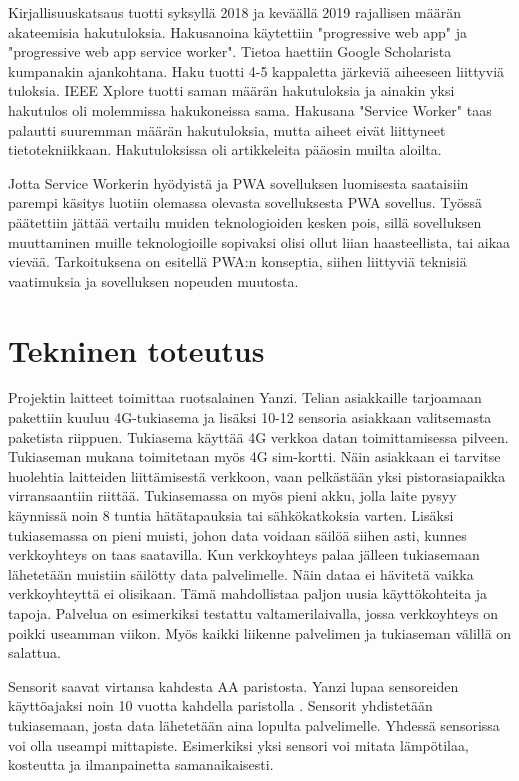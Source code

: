 \documentclass{tktltiki}
\begin{document}
Kirjallisuuskatsaus tuotti syksyllä 2018 ja keväällä 2019 rajallisen määrän akateemisia hakutuloksia. Hakusanoina käytettiin "progressive web app" ja "progressive web app service worker". Tietoa haettiin Google Scholarista kumpanakin ajankohtana. Haku tuotti 4-5 kappaletta järkeviä aiheeseen liittyviä tuloksia.  IEEE Xplore tuotti saman määrän hakutuloksia ja ainakin yksi hakutulos oli molemmissa hakukoneissa sama. Hakusana "Service Worker" taas palautti suuremman määrän hakutuloksia, mutta aiheet eivät liittyneet tietotekniikkaan. Hakutuloksissa oli artikkeleita pääosin muilta aloilta. 

Jotta Service Workerin hyödyistä ja PWA sovelluksen luomisesta saataisiin parempi käsitys luotiin olemassa olevasta sovelluksesta PWA sovellus. Työssä päätettiin jättää vertailu muiden teknologioiden kesken pois, sillä sovelluksen muuttaminen muille teknologioille sopivaksi olisi ollut liian haasteellista, tai aikaa vievää. Tarkoituksena on esitellä PWA:n konseptia, siihen liittyviä teknisiä vaatimuksia ja sovelluksen nopeuden muutosta.

\newpage
\section{Tekninen toteutus}

Projektin laitteet toimittaa ruotsalainen Yanzi. Telian asiakkaille tarjoamaan pakettiin kuuluu 4G-tukiasema ja lisäksi 10-12 sensoria asiakkaan valitsemasta paketista riippuen. Tukiasema käyttää 4G verkkoa datan toimittamisessa pilveen. Tukiaseman mukana toimitetaan myös 4G sim-kortti. Näin asiakkaan ei tarvitse huolehtia laitteiden liittämisestä verkkoon, vaan pelkästään yksi pistorasiapaikka virransaantiin riittää. Tukiasemassa on myös pieni akku, jolla laite pysyy käynnissä noin 8 tuntia hätätapauksia tai sähkökatkoksia varten. Lisäksi tukiasemassa on pieni muisti, johon data voidaan säilöä siihen asti, kunnes verkkoyhteys on taas saatavilla. Kun verkkoyhteys palaa jälleen tukiasemaan lähetetään muistiin säilötty data palvelimelle. Näin dataa ei hävitetä vaikka verkkoyhteyttä ei olisikaan. Tämä mahdollistaa paljon uusia käyttökohteita ja tapoja. Palvelua on esimerkiksi testattu valtamerilaivalla, jossa verkkoyhteys on poikki useamman viikon. Myös kaikki liikenne palvelimen ja tukiaseman välillä on salattua.

Sensorit saavat virtansa kahdesta AA paristosta. Yanzi lupaa sensoreiden käyttöajaksi noin 10 vuotta kahdella paristolla \cite{Yanzi}. Sensorit yhdistetään tukiasemaan, josta data lähetetään aina lopulta palvelimelle. Yhdessä sensorissa voi olla useampi mittapiste. Esimerkiksi yksi sensori voi mitata lämpötilaa, kosteutta ja ilmanpainetta samanaikaisesti. 
\end{document}
